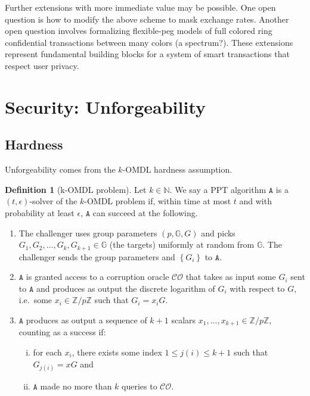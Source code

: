 \documentclass{mrl}
\theoremstyle{plain}
\theoremstyle{definition}
\newtheorem{defn}{Definition}[section]
\begin{document}
Further extensions with more immediate value may be possible. One open question is how to modify the above scheme to mask exchange rates. Another open question involves formalizing flexible-peg models of full colored ring confidential transactions between many colors (a spectrum?). These extensions represent fundamental building blocks for a system of smart transactions that respect user privacy. 


\appendix


\section{Security: Unforgeability}

\subsection{Hardness}

Unforgeability comes from the $k$-OMDL hardness assumption. 

\begin{defn}[k-OMDL problem]
Let $k \in \mathbb{N}$. We say a PPT algorithm $\texttt{A}$ is a $(t, \epsilon)$-solver of the $k$-OMDL problem if, within time at most $t$ and with probability at least $\epsilon$, $\texttt{A}$ can succeed at the following.

\begin{enumerate}
\item The challenger uses group parameters $(p, \mathbb{G}, G)$ and picks $G_1, G_2, \ldots, G_{k}, G_{k+1} \in \mathbb{G}$ (the targets) uniformly at random from $\mathbb{G}$. The challenger sends the group parameters and $\left\{G_i\right\}$ to $\texttt{A}$.

\item $\texttt{A}$ is granted access to a corruption oracle $\mathcal{CO}$ that takes as input some $G_i$ sent to $\texttt{A}$ and produces as output the discrete logarithm of $G_i$ with respect to $G$, i.e.\ some $x_i \in \mathbb{Z}/p\mathbb{Z}$ such that $G_i = x_i G$.

\item $\texttt{A}$ produces as output a sequence of $k+1$ scalars $x_1, \ldots, x_{k+1} \in \mathbb{Z}/p\mathbb{Z}$, counting as a success if:
\begin{enumerate}[(i)]
\item for each $x_i$, there exists some index $1 \leq j(i) \leq k+1$ such that $G_{j(i)} = xG$ and
\item $\texttt{A}$ made no more than $k$ queries to $\mathcal{CO}$. 
\end{enumerate}
\end{enumerate}
\end{defn}
\end{document}
